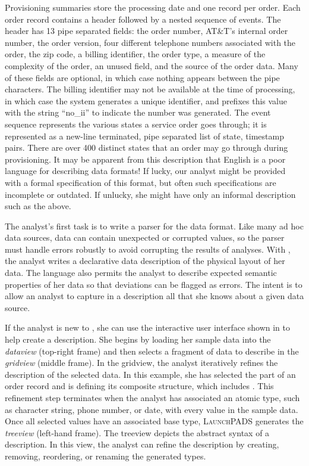 Provisioning summaries store the processing date and one record
per order.  Each order record contains a header followed by a nested
sequence of events.  The header has 13 pipe separated fields: the
order number, AT\&T's internal order number, the order version, four
different telephone numbers associated with the order, the zip code, a
billing identifier, the order type, a measure of the complexity of the
order, an unused field, and the source of the order data.  Many of
these fields are optional, in which case nothing appears between the
pipe characters.  The billing identifier may not be available at the
time of processing, in which case the system generates a unique
identifier, and prefixes this value with the string ``no\_ii'' to
indicate the number was generated. The event sequence represents the
various states a service order goes through; it is represented as a
new-line terminated, pipe separated list of state, timestamp pairs.
There are over 400 distinct states that an order may go through during
provisioning.  It may be apparent from this description that English
is a poor language for describing data formats!  If lucky, our analyst
might be provided with a formal specification of this format, but
often such specifications are incomplete or outdated.  If unlucky, she
might have only an informal description such as the above.

The analyst's first task is to write a parser for the \dibbler{} data
format.  Like many ad hoc data sources, \dibbler{} data can contain
unexpected or corrupted values, so the parser must handle errors
robustly to avoid corrupting the results of analyses.  With \pads{},
the analyst writes a declarative data description of the physical
layout of her data.  The language also permits the analyst to describe
expected semantic properties of her data so that deviations can be
flagged as errors. The intent is to allow an analyst to capture in a
\pads{} description all that she knows about a given data source.

If the analyst is new to \pads{}, she can use the interactive user
interface shown in  to help create a \pads{}
description.  She begins by loading her sample \dibbler{} data into
the {\it dataview} (top-right frame) and then selects a fragment of
data to describe in the {\it gridview} (middle frame).  In the
gridview, the analyst iteratively refines the description of the
selected data.  In this example, she has selected the 
part of an order record and is defining its composite structure, which
includes .  This refinement step terminates when the
analyst has associated an atomic type, such as character string, phone
number, or date, with every value in the sample data.  Once all
selected values have an associated base type, \textsc{LaunchPADS}
generates the {\it treeview} (left-hand frame).  The treeview depicts
the abstract syntax of a \pads{} description.  In this view, the
analyst can refine the description by creating, removing,
reordering, or renaming the generated types.

